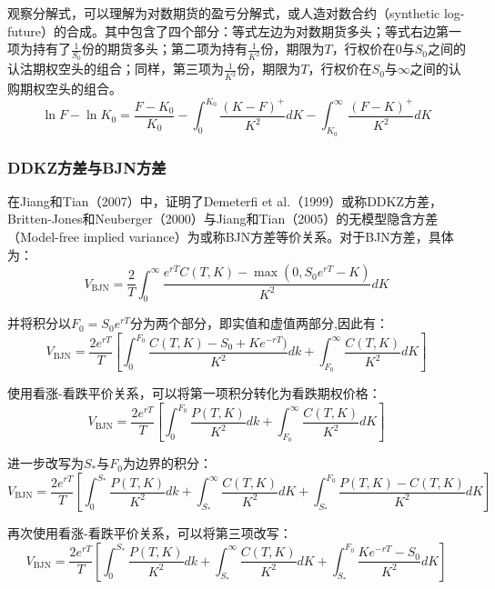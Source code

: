 \documentclass[11pt]{article}
\begin{document}
\begin{remark}
观察分解式，可以理解为对数期货的盈亏分解式，或人造对数合约（synthetic log-future）的合成。其中包含了四个部分：等式左边为对数期货多头；等式右边第一项为持有了$\frac{1}{S_0}$份的期货多头；第二项为持有$\frac{1}{K^2}$份，期限为$T$，行权价在$0$与$S_0$之间的认沽期权空头的组合；同样，第三项为$\frac{1}{K^2}$份，期限为$T$，行权价在$S_0$与$\infty$之间的认购期权空头的组合。
\begin{equation*}
    \boxed{
        \ln F - \ln K_0 = \frac{F-K_0}{K_0} - \int^{K_0}_{0} \frac{(K-F)^+}{K^2} dK - \int^{\infty}_{K_0} \frac{(F-K)^+}{K^2} dK 
    }
\end{equation*}
\end{remark}

\subsubsection{DDKZ方差与BJN方差}

在Jiang和Tian（2007）中，证明了Demeterfi et al.（1999）或称DDKZ方差，Britten-Jones和Neuberger（2000）与Jiang和Tian（2005）的无模型隐含方差（Model-free implied variance）为或称BJN方差等价关系。对于BJN方差，具体为：
\begin{equation*}
    V_{\text{BJN}} = \frac{2}{T} \int_{0}^{\infty} \frac{e^{rT}C(T,K) - \max(0,S_0 e^{rT}-K)}{K^2} dK
\end{equation*}

并将积分以$F_0 = S_0 e^{rT}$分为两个部分，即实值和虚值两部分,因此有：
\begin{equation*}
    V_{\text{BJN}} = \frac{2 e^{rT}}{T} \left[ \int_{0}^{F_0} \frac{C(T,K) - S_0 + K e^{-rT})}{K^2}dk + \int_{F_0}^{\infty} \frac{C(T,K)}{K^2} dK \right]
\end{equation*}

使用看涨-看跌平价关系，可以将第一项积分转化为看跌期权价格：
\begin{equation*}
    V_{\text{BJN}} = \frac{2 e^{rT}}{T} \left[ \int_{0}^{F_0} \frac{P(T,K)}{K^2} dk + \int_{F_0}^{\infty} \frac{C(T,K)}{K^2} dK \right]
\end{equation*}

进一步改写为$S_*$与$F_0$为边界的积分：
\begin{equation*}
    V_{\text{BJN}} = \frac{2 e^{rT}}{T} \left[ \int_{0}^{S_*} \frac{P(T,K)}{K^2} dk + \int_{S_*}^{\infty} \frac{C(T,K)}{K^2} dK + \int_{S_*}^{F_0} \frac{P(T,K) - C(T,K)}{K^2} dK \right]
\end{equation*}

再次使用看涨-看跌平价关系，可以将第三项改写：
\begin{equation*}
    V_{\text{BJN}} = \frac{2 e^{rT}}{T} \left[ \int_{0}^{S_*} \frac{P(T,K)}{K^2} dk + \int_{S_*}^{\infty} \frac{C(T,K)}{K^2} dK  + \int_{S_*}^{F_0} \frac{K e^{-rT} - S_0 }{K^2} dK \right]
\end{equation*}
\end{document}
